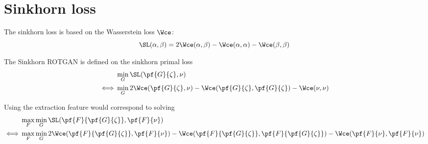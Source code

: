 \documentclass[11pt,a4paper]{article}
\begin{document}
\section*{Sinkhorn loss}
The sinkhorn loss is based on the Wasserstein loss $\Wce$:
\begin{equation}
    \SL(\alpha, \beta) = 2 \Wce(\alpha, \beta) - \Wce(\alpha, \alpha) - \Wce(\beta, \beta)
\end{equation}

The Sinkhorn ROTGAN is defined on the sinkhorn primal loss
\begin{align}
    &\min_{G} \SL(\pf{G}{\zeta}, \nu)  \\
    \iff & \min_{G} 2 \Wce(\pf{G}{\zeta}, \nu) - \Wce(\pf{G}{\zeta}, \pf{G}{\zeta}) - \Wce(\nu, \nu)
\end{align}

Using the extraction feature would correspond to solving
\begin{align}
    &\max_{F} \min_{G} \SL(\pf{F}{\pf{G}{\zeta}}, \pf{F}{\nu}) \\
    \iff & \max_{F} \min_{G} 2 \Wce(\pf{F}{\pf{G}{\zeta}}, \pf{F}{\nu}) - \Wce(\pf{F}{\pf{G}{\zeta}}, \pf{F}{\pf{G}{\zeta}}) - \Wce(\pf{F}{\nu}, \pf{F}{\nu})
\end{align}

\printbibliography{}
\end{document}
